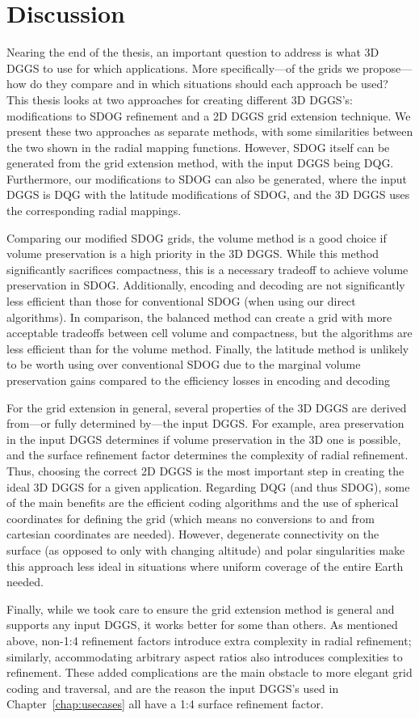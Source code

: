 \chapter{Discussion} \label{chap:discussion}
Nearing the end of the thesis, an important question to address is what 3D DGGS to use for which applications.
More specifically---of the grids we propose---how do they compare and in which situations should each approach be used?
This thesis looks at two approaches for creating different 3D DGGS's: modifications to SDOG refinement and a 2D DGGS grid extension technique.
We present these two approaches as separate methods, with some similarities between the two shown in the radial mapping functions.
However, SDOG itself can be generated from the grid extension method, with the input DGGS being DQG.
Furthermore, our modifications to SDOG can also be generated, where the input DGGS is DQG with the latitude modifications of SDOG, and the 3D DGGS uses the corresponding radial mappings.


Comparing our modified SDOG grids, the volume method is a good choice if volume preservation is a high priority in the 3D DGGS.
While this method significantly sacrifices compactness, this is a necessary tradeoff to achieve volume preservation in SDOG. Additionally, encoding and decoding are not significantly less efficient than those for conventional SDOG (when using our direct algorithms).
In comparison, the balanced method can create a grid with more acceptable tradeoffs between cell volume and compactness, but the algorithms are less efficient than for the volume method.
Finally, the latitude method is unlikely to be worth using over conventional SDOG due to the marginal volume preservation gains compared to the efficiency losses in encoding and decoding


For the grid extension in general, several properties of the 3D DGGS are derived from---or fully determined by---the input DGGS.
For example, area preservation in the input DGGS determines if volume preservation in the 3D one is possible, and the surface refinement factor determines the complexity of radial refinement.
Thus, choosing the correct 2D DGGS is the most important step in creating the ideal 3D DGGS for a given application.
Regarding DQG (and thus SDOG), some of the main benefits are the efficient coding algorithms and the use of spherical coordinates for defining the grid (which means no conversions to and from cartesian coordinates are needed).
However, degenerate connectivity on the surface (as opposed to only with changing altitude) and polar singularities make this approach less ideal in situations where uniform coverage of the entire Earth needed.


Finally, while we took care to ensure the grid extension method is general and supports any input DGGS, it works better for some than others.
As mentioned above, non-1:4 refinement factors introduce extra complexity in radial refinement; similarly, accommodating arbitrary aspect ratios also introduces complexities to refinement.
These added complications are the main obstacle to more elegant grid coding and traversal, and are the reason the input DGGS's used in Chapter~\ref{chap:usecases} all have a 1:4 surface refinement factor.
